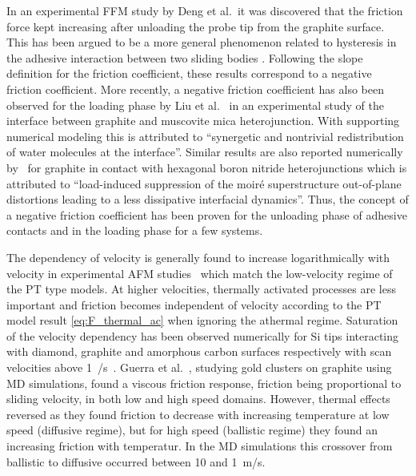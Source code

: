 In an experimental \acrshort{FFM} study by Deng et al.\ it was discovered that
the friction force kept increasing after unloading the probe tip from the
graphite surface. This has been argued to be a more general phenomenon
related to hysteresis in the adhesive interaction between two sliding bodies
\cite{thormann_negative_2013}. Following the slope definition for the friction
coefficient, these results correspond to a negative friction coefficient. More recently, a negative friction coefficient has also been observed for the loading phase by Liu et al.~\cite{Liu_2020} in an experimental study of the interface between graphite and muscovite mica heterojunction. With supporting numerical modeling this is attributed to ``synergetic and nontrivial redistribution of water molecules at the interface''. Similar results are also reported numerically by~\cite{Mandelli_2019} for graphite in contact with hexagonal boron nitride heterojunctions which is attributed to ``load-induced suppression of the moiré superstructure out-of-plane distortions leading to a less dissipative interfacial dynamics''. Thus, the concept of a negative friction coefficient has been proven for the unloading phase of adhesive contacts and in the loading phase for a few systems. 

The dependency of velocity is generally found to increase logarithmically with
velocity in experimental \acrshort{AFM} studies~\cite[p. 201]{gnecco_meyer_2015}
which match the low-velocity regime of the \acrshort{PT} type models. At higher
velocities, thermally activated processes are less important and friction becomes
independent of velocity according to the \acrshort{PT} model result \cref{eq:F_thermal_ac} when ignoring the athermal regime. Saturation of the velocity dependency has been observed numerically for Si tips interacting with diamond, graphite and amorphous carbon surfaces respectively with scan velocities above \SI{1}{\mu/s}~\cite{zworner1998velocity}.  Guerra et al.~\cite{Guerra_2010}, studying gold clusters on graphite using \acrshort{MD} simulations, found a viscous friction response, friction being proportional to sliding velocity, in both low and high speed domains. However, thermal effects reversed as they found friction to decrease with increasing temperature at low speed (diffusive regime), but for high speed (ballistic regime) they found an increasing friction with temperatur. In the \acrshort{MD} simulations this crossover from ballistic to diffusive occurred between 10 and \SI{1}{m/s}. 


